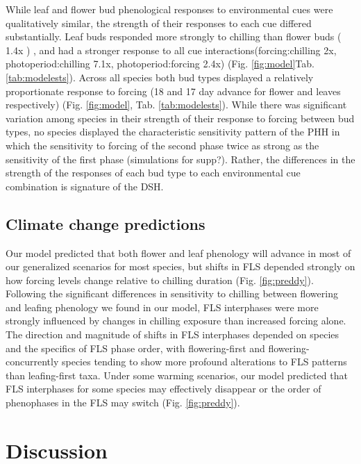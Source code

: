 \documentclass[11pt]{article}
\begin{document}
\noindent While leaf and flower bud phenological responses to environmental cues were qualitatively similar, the strength of their responses to each cue differed substantially. Leaf buds responded more strongly to chilling than flower buds ( 1.4x ) , and had a stronger response to all cue interactions(forcing:chilling 2x, photoperiod:chilling 7.1x, photoperiod:forcing 2.4x) (Fig. \ref{fig:model}Tab. \ref{tab:modelests}). Across all species both bud types displayed a relatively proportionate response to forcing (18 and 17 day advance for flower and leaves respectively) (Fig. \ref{fig:model}, Tab. \ref{tab:modelests}). While there was significant variation among species in their strength of their response to forcing between bud types, no species displayed the characteristic sensitivity pattern of the PHH in which the sensitivity to forcing of the second phase twice as strong as the sensitivity of the first phase (simulations for supp?). Rather, the differences in the strength of the responses of each bud type to each environmental cue combination is signature of the DSH.\\

    \subsection*{Climate change predictions}
\noindent Our model predicted that both flower and leaf phenology will advance in most of our generalized scenarios for most species, but shifts in FLS depended strongly on how forcing levels change relative to chilling duration (Fig. \ref{fig:preddy}). Following the significant differences in sensitivity to chilling between flowering and leafing phenology we found in our model, FLS interphases were more strongly influenced by changes in chilling exposure than increased forcing alone. The direction and magnitude of shifts in FLS interphases depended on species and the specifics of FLS phase order, with flowering-first and flowering-concurrently species tending to show more profound alterations to FLS patterns than leafing-first taxa. Under some warming scenarios, our model predicted that  FLS interphases for some species may effectively disappear or the order of phenophases in the FLS may switch (Fig. \ref{fig:preddy}).


\section*{Discussion}
\end{document}

